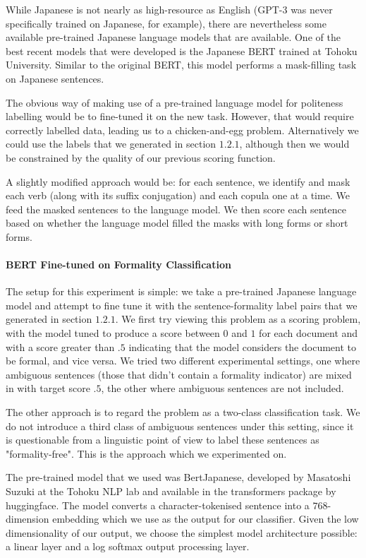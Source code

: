 \documentclass[11pt]{article}
\begin{document}
While Japanese is not nearly as high-resource as English (GPT-3 was never specifically trained on Japanese, for example), there are nevertheless some available pre-trained Japanese language models that are available. One of the best recent models that were developed is the Japanese BERT trained at Tohoku University. Similar to the original BERT, this model performs a mask-filling task on Japanese sentences. 

The obvious way of making use of a pre-trained language model for politeness labelling would be to fine-tuned it on the new task. However, that would require correctly labelled data, leading us to a chicken-and-egg problem. Alternatively we could use the labels that we generated in section $1.2.1$, although then we would be constrained by the quality of our previous scoring function.

A slightly modified approach would be: for each sentence, we identify and mask each verb (along with its suffix conjugation) and each copula one at a time. We feed the masked sentences to the language model. We then score each sentence based on whether the language model filled the masks with long forms or short forms.

\paragraph{BERT Fine-tuned on Formality Classification}

The setup for this experiment is simple: we take a pre-trained Japanese language model and attempt to fine tune it with the sentence-formality label pairs that we generated in section $1.2.1$. We first try viewing this problem as a scoring problem, with the model tuned to produce a score between $0$ and $1$ for each document and with a score greater than $.5$ indicating that the model considers the document to be formal, and vice versa. We tried two different experimental settings, one where ambiguous sentences (those that didn't contain a formality indicator) are mixed in with target score $.5$, the other where ambiguous sentences are not included.

The other approach is to regard the problem as a two-class classification task. We do not introduce a third class of ambiguous sentences under this setting, since it is questionable from a linguistic point of view to label these sentences as "formality-free". This is the approach which we experimented on.

The pre-trained model that we used was BertJapanese, developed by Masatoshi Suzuki at the Tohoku NLP lab and available in the transformers package by huggingface. The model converts a character-tokenised sentence into a $768$-dimension embedding which we use as the output for our classifier. Given the low dimensionality of our output, we choose the simplest model architecture possible: a linear layer and a log softmax output processing layer.
\end{document}
